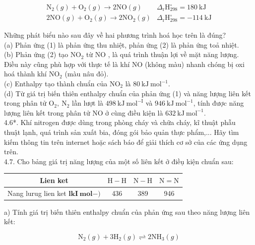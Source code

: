 \documentclass[10pt]{article}
\begin{document}
\[
\begin{array}{ll}
\mathrm{N}_{2}(g)+\mathrm{O}_{2}(g) \rightarrow 2 \mathrm{NO}(g) & \Delta_{\mathrm{r}} \mathrm{H}_{298}^{\circ}=180 \mathrm{~kJ} \\
2 \mathrm{NO}(g)+\mathrm{O}_{2}(g) \rightarrow 2 \mathrm{NO}_{2}(g) & \Delta_{\mathrm{r}} \mathrm{H}_{298}^{\circ}=-114 \mathrm{~kJ} \tag{2}
\end{array}
\]

Những phát biểu nào sau đây về hai phương trình hoá học trên là đúng?\\
(a) Phản ứng (1) là phản ứng thu nhiệt, phản ứng (2) là phản ứng toả nhiệt.\\
(b) Phản ứng (2) tạo $\mathrm{NO}_{2}$ từ NO , là quá trình thuận lợi về mặt năng lượng. Điều này cũng phù hợp với thực tế là khí NO (không màu) nhanh chóng bị oxi hoá thành khí $\mathrm{NO}_{2}$ (màu nâu đỏ).\\
(c) Enthalpy tạo thành chuẩn của $\mathrm{NO}_{2}$ là $80 \mathrm{~kJ} \mathrm{~mol}^{-1}$.\\
(d) Từ giá trị biến thiên enthalpy chuẩn của phản ứng (1) và năng lượng liên kết trong phân tử $\mathrm{O}_{2}, \mathrm{~N}_{2}$ lần lượt là $498 \mathrm{~kJ} \mathrm{~mol}^{-\mathrm{I}}$ và $946 \mathrm{~kJ} \mathrm{~mol}^{-1}$, tính được năng lượng liên kết trong phân tử NO ở cùng điều kiện là $632 \mathrm{~kJ} \mathrm{~mol}^{-1}$.\\
4.6*. Khí nitrogen được dùng trong phòng cháy và chữa cháy, kĩ thuật phẫu thuật lạnh, quá trình sản xuất bia, đóng gói bảo quản thực phẩm,... Hãy tìm kiếm thông tin trên internet hoặc sách báo để giải thích cơ sở của các ứng dụng trên.\\
4.7. Cho bảng giá trị năng lượng của một số liên kết ở điềụ kiện chuẩn sau:

\begin{center}
\begin{tabular}{|c|c|c|c|}
\hline
Lien ket & $\mathrm{H}-\mathrm{H}$ & $\mathrm{N}-\mathrm{H}$ & $\mathrm{N}=\mathrm{N}$ \\
\hline
Nang lurug lien ket $\mathbf{l} \mathbf{k} \mathbf{I} \mathbf{~ m o l} \mathbf{-} \mathbf{)}$ & 436 & 389 & 946 \\
\hline
\end{tabular}
\end{center}

a) Tính giá trị biến thiên enthalpy chuẩn của phản ứng sau theo năng lượng liên kết:

$$
\mathrm{N}_{2}(g)+3 \mathrm{H}_{2}(g) \rightleftharpoons 2 \mathrm{NH}_{3}(g)
$$
\end{document}
